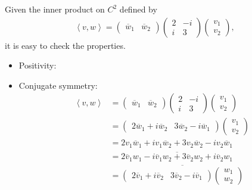 \begin{questions}

\begin{solution}
Given the inner product on $C^2$ defined by
\begin{align*}
\left<v,w\right>=\begin{pmatrix}
\overline{w}_1&\overline{w}_2
\end{pmatrix}\begin{pmatrix}
2&-i\\i&3
\end{pmatrix}\begin{pmatrix}
v_1\\v_2
\end{pmatrix},
\end{align*}
it is easy to check the properties.
\begin{itemize}
\item Positivity:
\item Conjugate symmetry:
\begin{align*}
\left<v,w\right>&=\begin{pmatrix}
\overline{w}_1&\overline{w}_2
\end{pmatrix}\begin{pmatrix}
2&-i\\i&3
\end{pmatrix}\begin{pmatrix}
v_1\\v_2
\end{pmatrix}\\
&=\begin{pmatrix}
2\overline{w}_1+i\overline{w}_2&3\overline{w}_2-i\overline{w}_1
\end{pmatrix}\begin{pmatrix}
v_1\\v_2
\end{pmatrix}\\
&=2v_1\overline{w}_1+iv_1\overline{w}_2+3v_2\overline{w}_2-iv_2\overline{w}_1\\
&=\overline{2\overline{v}_1w_1-i\overline{v}_1w_2+3\overline{v}_2w_2+i\overline{v}_2w_1}\\
&=\overline{\begin{pmatrix}2\overline{v}_1+i\overline{v}_2&3\overline{v}_2-i\overline{v}_1
\end{pmatrix}\begin{pmatrix}
w_1\\w_2
\end{pmatrix}}\\

\end{align*}
\end{itemize}
\end{solution}
\end{questions}
